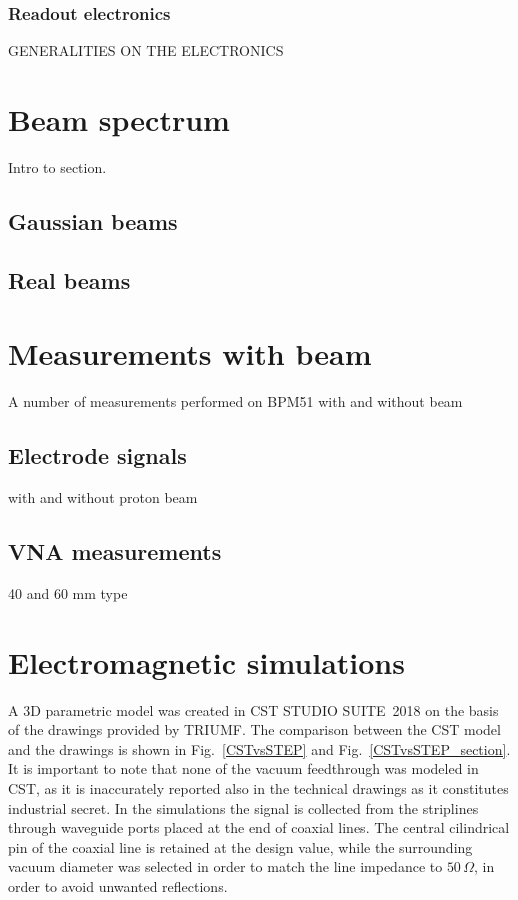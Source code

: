 \subsubsection{Readout electronics}

GENERALITIES ON THE ELECTRONICS


\section[Beam spectrum]{Beam spectrum}

Intro to section.

\subsection[Gaussian beams]{Gaussian beams}

\subsection[Real beams]{Real beams}


\section[Measurements with beam]{Measurements with beam}

A number of measurements performed on BPM51 with and without beam

\subsection[Electrode signals]{Electrode signals}

with and without proton beam

\subsection[VNA measurements]{VNA measurements}

40 and 60 mm type

\section[Electromagnetic simulations]{Electromagnetic simulations}

A 3D parametric model was created in CST STUDIO SUITE\textregistered~2018 on the basis of the drawings provided by TRIUMF. The comparison between the CST model and the drawings is shown in Fig.~\ref{CSTvsSTEP} and Fig.~\ref{CSTvsSTEP_section}. It is important to note that none of the vacuum feedthrough was modeled in CST, as it is inaccurately reported also in the technical drawings as it constitutes industrial secret. In the simulations the signal is collected from the striplines through waveguide ports placed at the end of coaxial lines. The central cilindrical pin of the coaxial line is retained at the design value, while the surrounding vacuum diameter was selected in order to match the line impedance to $50\,\Omega$, in order to avoid unwanted reflections.


